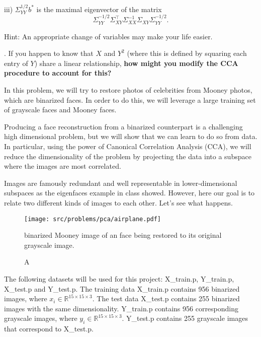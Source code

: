 \begin{Parts}
iii) $\Sigma_{YY}^{1/2} b^*$ is the maximal eigenvector of the matrix $$\Sigma_{YY}^{-1/2} \Sigma_{XY}^\top \Sigma_{XX}^{-1} \Sigma_{XY} \Sigma_{YY}^{-1/2}.$$

Hint: An appropriate change of variables may make your life easier.




. If you happen to know that $X$ and $Y^2$ (where this is defined by squaring each entry of $Y$) share a linear relationship, {\bf how might you modify the CCA procedure to account for this?}



\end{Parts}

In this problem, we will try to restore photos of celebrities from Mooney photos, which are binarized faces. In order to do this, we will leverage a large training set of grayscale faces and Mooney faces. 

Producing a face reconstruction from a binarized counterpart is a
challenging high dimensional problem, but we will show that we can
learn to do so from data. In particular, using the power of Canonical
Correlation Analysis (CCA), we will reduce the dimensionality of the
problem by projecting the data into a subspace where the images are
most correlated. 

Images are famously redundant and well representable in lower-dimensional
subspaces as the eigenfaces example in class showed. However, here our
goal is to relate two different kinds of images to each other. Let's
see what happens.

\begin{figure}[h!]
    \begin{center}
    \texttt{[image: src/problems/pca/airplane.pdf]}
    {\caption A binarized Mooney image of an face being restored to its original grayscale image.  } \label{fig:robot}
    \end{center}
\end{figure}


The following datasets will be used for this project: X\_train.p,
Y\_train.p, X\_test.p and Y\_test.p. The training data X\_train.p
contains 956 binarized images, where $x_i \in \mathbb{R}^{15 \times 15
  \times 3}$. The test data X\_test.p contains 255 binarized images
with the same dimensionality. Y\_train.p contains 956 corresponding
grayscale images, where $y_i \in  \mathbb{R}^{ 15 \times 15 \times 3
}$. Y\_test.p contains 255 grayscale images that correspond to
X\_test.p. 

